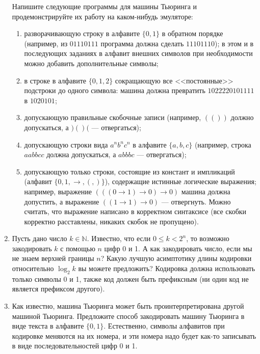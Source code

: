 \documentclass[10pt,a4paper,oneside]{article}
\begin{document}
\begin{enumerate}
Напишите следующие программы для машины Тьюринга и продемонстрируйте их работу на каком-нибудь эмуляторе:
\begin{enumerate}
\item разворачивающую строку в алфавите $\{0,1\}$ в обратном порядке (например, из $01110111$ программа должна сделать $11101110$);
в этом и в последующих заданиях в алфавит внешних символов при необходимости можно добавить дополнительные символы;
\item в строке в алфавите $\{0,1,2\}$ сокращающую все <<постоянные>> подстроки до одного символа:
машина должна превратить $1022220101111$ в $1020101$;
\item допускающую правильные скобочные записи (например, $(())$ должно допускаться, а $)()($ --- отвергаться);
\item допускающую строки вида $a^nb^nc^n$ в алфавите $\{a,b,c\}$ (например, строка $aabbcc$ должна допускаться, а $abbbc$ --- отвергаться);
\item допускающую только строки, состоящие из констант и импликаций (алфавит $\{ 0, 1, \rightarrow, (, ) \}$), 
содержащие истинные логические выражения;
например, выражение $(((0 \rightarrow 1) \rightarrow 0) \rightarrow 0)$ машина должна допустить, а
выражение $((1 \rightarrow 1) \rightarrow 0)$ --- отвергнуть. Можно считать, что выражение написано в корректном синтаксисе (все скобки корректно
расставлены, никаких скобок не пропущено).
\end{enumerate}

\item Пусть дано число $k \in \mathbb{N}$. Известно, что если $0 \le k < 2^n$, то возможно закодировать $k$ с помощью $n$ цифр 0 и 1.
А как закодировать число, если мы не знаем верхней границы $n$? Какую лучшую асимптотику длины кодировки относительно $\log_2 k$ вы можете
предложить? Кодировка должна использовать только символы 0 и 1, также код должен быть префиксным (ни один код не является префиксом другого).

\item Как известно, машина Тьюринга может быть проинтерпретирована другой машиной Тьюринга.
Предложите способ закодировать машину Тьюринга в виде текста в алфавите $\{0,1\}$.
Естественно, символы алфавитов при кодировке меняются на их номера, и эти номера надо будет как-то записывать в виде последовательностей цифр 0 и 1.
\end{enumerate}
\end{document}
